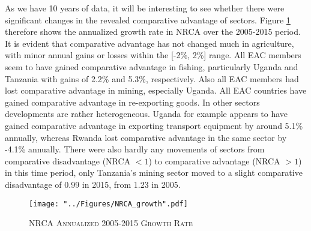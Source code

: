 \documentclass[a4paper]{article}
\begin{document}
As we have 10 years of data, it will be interesting to see whether there were significant changes in the revealed comparative advantage of sectors. Figure \ref{fig:NRCA_growth} therefore shows the annualized growth rate in NRCA over the 2005-2015 period. It is evident that comparative advantage has not changed much in agriculture, with minor annual gains or losses within the [-2\%, 2\%] range. All EAC members seem to have gained comparative advantage in fishing, particularly Uganda and Tanzania with gains of 2.2\% and 5.3\%, respectively. Also all EAC members had lost comparative advantage in mining, especially Uganda. All EAC countries have gained comparative advantage in re-exporting goods. In other sectors developments are rather heterogeneous. Uganda for example appears to have gained comparative advantage in exporting transport equipment by around 5.1\% annually, whereas Rwanda lost comparative advantage in the same sector by -4.1\% annually. There were also hardly any movements of sectors from comparative disadvantage (NRCA $< 1$) to comparative advantage (NRCA $> 1$) in this time period, only Tanzania's mining sector moved to a slight comparative disadvantage of 0.99 in 2015, from 1.23 in 2005. 



\begin{figure}[h!]
\centering
\caption{\label{fig:NRCA_growth}\textsc{NRCA Annualized 2005-2015 Growth Rate}}
\texttt{[image: "../Figures/NRCA\_growth".pdf]} %
\end{figure}
\FloatBarrier

\end{document}
